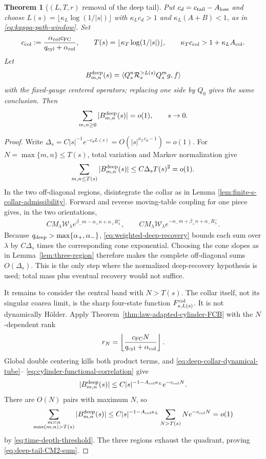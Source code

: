 \documentclass[11pt]{article}
\newtheorem{theorem}{Theorem}[section]
\begin{document}
\begin{theorem}[$(L,T,r)$ removal of the deep tail]
\label{thm:time-depth-diagonal}
Put $c_d=c_{\rm tail}-A_{\rm loss}$ and choose
$L(s)=\lfloor\kappa_L\log(1/|s|)\rfloor$ with
$\kappa_Lc_d>1$ and $\kappa_L(A+B)<1$, as in
\eqref{eq:kappa-path-window}.  Set
\begin{equation}
\label{eq:time-depth-threshold}
 c_{\rm col}:=
 \frac{\alpha_{\rm col}c_{\rm FC}}
      {q_{\rm cyl}+\alpha_{\rm col}},\qquad
 T(s)=\lfloor\kappa_T\log(1/|s|)\rfloor,\qquad
 \kappa_Tc_{\rm col}>1+\kappa_LA_{\rm col}.
\end{equation}
Let
\[
 B^{\rm deep}_{m,n}(s)=
 \langle Q_s^n\mathcal R_s^{>L(s)}Q_s^mg,f\rangle
\]
with the fixed-gauge centered operators; replacing one side by $Q_0$ gives
the same conclusion.  Then
\begin{equation}
\label{eq:deep-tail-CM2-sum}
 \sum_{m,n\ge0}|B^{\rm deep}_{m,n}(s)|=o(1),
 \qquad s\to0.
\end{equation}
\end{theorem}

\begin{proof}
Write
$\Delta_s=C|s|^{-1}e^{-c_dL(s)}
=O(|s|^{\kappa_Lc_d-1})=o(1)$.
For $N=\max\{m,n\}\le T(s)$, total variation and Markov normalization give
\[
 \sum_{m,n\le T(s)}|B^{\rm deep}_{m,n}(s)|
 \le C\Delta_sT(s)^2=o(1).
\]
In the two off-diagonal regions, disintegrate the collar as in Lemma
\ref{lem:finite-s-collar-admissibility}.  Forward and reverse moving-table
coupling for one piece gives, in the two orientations,
\begin{align*}
 C M_\lambda\mathcal W_\lambda
 e^{\beta_-m-\alpha_+n+\alpha_+R^+_\lambda},\qquad
 C M_\lambda\mathcal W_\lambda
 e^{-\alpha_-m+\beta_+n+\alpha_-R^-_\lambda}.
\end{align*}
Because $q_{\rm deep}>\max\{\alpha_+,\alpha_-\}$,
\eqref{eq:weighted-deep-recovery} bounds each sum over $\lambda$ by
$C\Delta_s$ times the corresponding cone exponential.  Choosing the cone
slopes as in Lemma~\ref{lem:three-region} therefore makes the complete
off-diagonal sums $O(\Delta_s)$.  This is the only step where the normalized
deep-recovery hypothesis is used; total mass plus eventual recovery would
not suffice.

It remains to consider the central band with $N>T(s)$.  The collar itself,
not its singular coarea limit, is the sharp four-state function
$F_{s,L(s)}^{\rm col}$.  It is not dynamically H\"older.  Apply
Theorem~\ref{thm:law-adapted-cylinder-FCB} with the $N$-dependent rank
\[
 r_N=\left\lfloor
 \frac{c_{\rm FC}N}{q_{\rm cyl}+\alpha_{\rm col}}
 \right\rfloor.
\]
Global double centering kills both product terms, and
\eqref{eq:deep-collar-dynamical-tube}--
\eqref{eq:cylinder-functional-correlation} give
\[
 |B^{\rm deep}_{m,n}(s)|
 \le C|s|^{-1-A_{\rm col}\kappa_L}e^{-c_{\rm col}N}.
\]
There are $O(N)$ pairs with maximum $N$, so
\[
 \sum_{\substack{m\asymp n\\\max(m,n)>T(s)}}
 |B^{\rm deep}_{m,n}(s)|
 \le C|s|^{-1-A_{\rm col}\kappa_L}
       \sum_{N>T(s)}Ne^{-c_{\rm col}N}=o(1)
\]
by \eqref{eq:time-depth-threshold}.  The three regions exhaust the quadrant,
proving \eqref{eq:deep-tail-CM2-sum}.
\end{proof}
\end{document}
